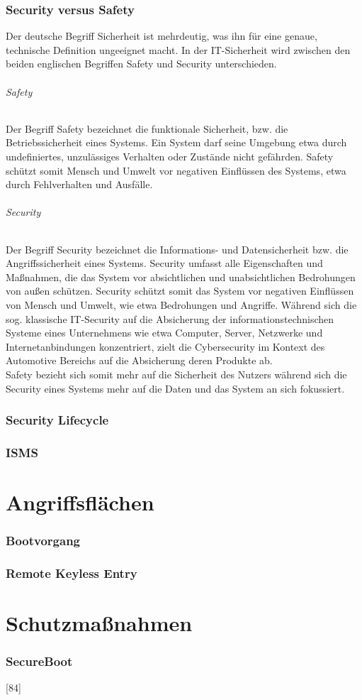 \subsection{Security versus Safety}
Der deutsche Begriff \glqq Sicherheit\grqq{} ist mehrdeutig, was ihn für eine genaue, technische Definition ungeeignet macht. In der IT-Sicherheit wird zwischen den beiden englischen Begriffen \glqq Safety\grqq{} und \glqq Security\grqq{} unterschieden.
\subparagraph{Safety}
\glqq Der Begriff Safety bezeichnet die funktionale Sicherheit, bzw. die Betriebssicherheit eines Systems. Ein System darf seine Umgebung etwa durch undefiniertes, unzulässiges Verhalten oder Zustände nicht gefährden. Safety schützt somit Mensch und Umwelt vor negativen Einflüssen des Systems, etwa durch Fehlverhalten und Ausfälle.\grqq{} \cite[2]{Wurm.2022}
\subparagraph{Security}
\glqq Der Begriff Security bezeichnet die Informations- und Datensicherheit bzw. die Angriffssicherheit eines Systems. Security umfasst alle Eigenschaften und Maßnahmen, die das System vor absichtlichen und unabsichtlichen Bedrohungen
von außen schützen. Security schützt somit das System vor negativen Einflüssen von Mensch und Umwelt, wie etwa Bedrohungen und Angriffe. Während sich die sog. klassische IT-Security auf die Absicherung der informationstechnischen Systeme eines Unternehmens wie etwa Computer, Server, Netzwerke und Internetanbindungen konzentriert, zielt die Cybersecurity im Kontext des Automotive Bereichs auf die Absicherung deren Produkte ab.\grqq{} \cite[2\psq]{Wurm.2022}\\

Safety bezieht sich somit mehr auf die Sicherheit des Nutzers während sich die Security eines Systems mehr auf die Daten und das System an sich fokussiert.

\subsection{Security Lifecycle}
\cite{Wurm.2022}
\subsection{ISMS}


\chapter{Angriffsflächen}
\subsection{Bootvorgang}
\cite{Wurm.2022}

\subsection{Remote Keyless Entry}
\cite{Garcia.2016}


\chapter{Schutzmaßnahmen}
\subsection{SecureBoot}
\cite{Wurm.2022}[84]